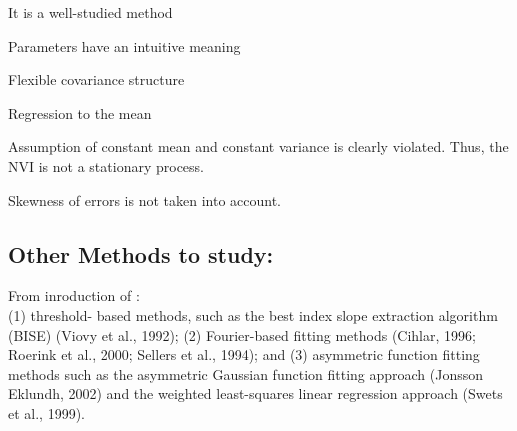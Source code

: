 \begin{my_pros_cons_table}{
    \item It is a well-studied method
    \item Parameters have an intuitive meaning
    \item Flexible covariance structure
  }{
    \item Regression to the mean
    \item Assumption of constant mean and constant variance is clearly violated. Thus, the NVI is not a stationary process.
    \item Skewness of errors is not taken into account.
  }
\end{my_pros_cons_table}


\subsection{Other Methods to study:}
From inroduction of \cite{chenSimpleMethodReconstructing2004a}:\\
(1) threshold-
based methods, such as the best index slope extraction
algorithm (BISE) (Viovy et al., 1992); (2) Fourier-based
fitting methods (Cihlar, 1996; Roerink et al., 2000; Sellers
et al., 1994); and (3) asymmetric function fitting methods
such as the asymmetric Gaussian function fitting approach
(Jonsson Eklundh, 2002) and the weighted least-squares
linear regression approach (Swets et al., 1999).
